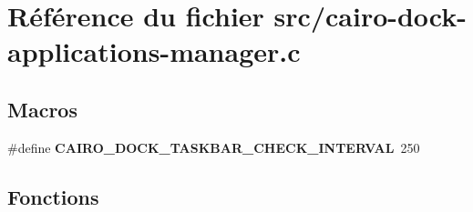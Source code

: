 \section{R\'{e}f\'{e}rence du fichier src/cairo-dock-applications-manager.c}
\label{cairo-dock-applications-manager_8c}
\subsection*{Macros}
\begin{CompactItemize}
\item 
\#define {\bf CAIRO\_\-DOCK\_\-TASKBAR\_\-CHECK\_\-INTERVAL}~250
\end{CompactItemize}
\subsection*{Fonctions}
